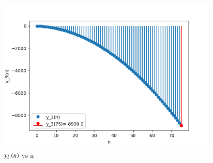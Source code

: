 \documentclass[journal,12pt,onecolumn]{IEEEtran}
\theoremstyle{remark}
\begin{document}
\begin{enumerate}
\begin{figure}[!ht]   
\centering
\graphicspath{ {figs/} }
\includegraphics[width=12cm, height=8cm]{graph_3}
\caption{$y_3\left(n\right)$ vs n }\label{graph:ee25-g4}
\end{figure}
 \end{enumerate}
\end{document}
